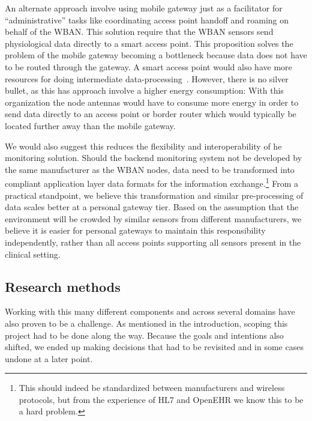 An alternate approach involve using mobile gateway just as a facilitator for ``administrative'' tasks like coordinating access point handoff and roaming on behalf of the WBAN. This solution require that the WBAN sensors send physiological data directly to a smart access point. This proposition solves the problem of the mobile gateway becoming a bottleneck because data does not have to be routed through the gateway. A smart access point would also have more resources for doing intermediate data-processing~\cite{DrAmirMohammadRahmani:2014vx}. However, there is no silver bullet, as this has approach involve a higher energy consumption: With this organization the node antennas would have to consume more energy in order to send data directly to an access point or border router which would typically be located further away than the mobile gateway. 

We would also suggest this reduces the flexibility and interoperability of he monitoring solution. Should the backend monitoring system not be developed by the same manufacturer as the WBAN nodes, data need to be transformed into compliant application layer data formats for the information exchange.\footnote{ This should indeed be standardized between manufacturers and wireless protocols, but from the experience of HL7 and OpenEHR we know this to be a hard problem.} From a practical standpoint, we believe this transformation and similar pre-processing of data scales better at a personal gateway tier. Based on the assumption that the environment will be crowded by similar sensors from different manufacturers, we believe it is easier for personal gateways to maintain this responsibility independently, rather than all access points supporting all sensors present in the clinical setting.


\subsection{Research methods} %
\label{ssub:research_methods}

Working with this many different components and across several domains have also proven to be a challenge. As mentioned in the introduction, scoping this project had to be done along the way. Because the goals and intentions also shifted, we ended up making decisions that had to be revisited and in some cases undone at a later point.

